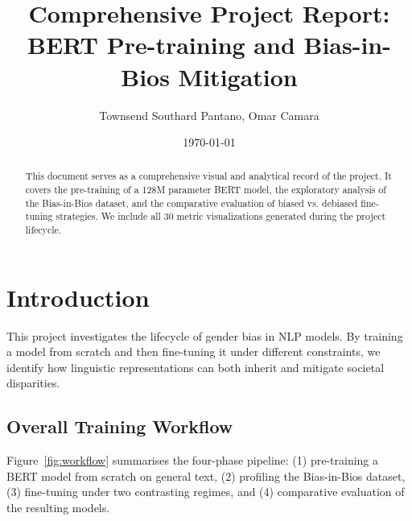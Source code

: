 \documentclass[11pt,letterpaper]{article}
\title{\textbf{Comprehensive Project Report: \\ BERT Pre-training and Bias-in-Bios Mitigation}}
\author{Townsend Southard Pantano, Omar Camara}
\date{\today}
\begin{document}
	
	\maketitle
	
	\begin{abstract}
		This document serves as a comprehensive visual and analytical record of the project. It covers the pre-training of a 128M parameter BERT model, the exploratory analysis of the Bias-in-Bios dataset, and the comparative evaluation of biased vs. debiased fine-tuning strategies. We include all 30 metric visualizations generated during the project lifecycle.
	\end{abstract}
	
	\section{Introduction}
	This project investigates the lifecycle of gender bias in NLP models. By training a model from scratch and then fine-tuning it under different constraints, we identify how linguistic representations can both inherit and mitigate societal disparities.
	
	\subsection{Overall Training Workflow}
	Figure~\ref{fig:workflow} summarises the four-phase pipeline: (1) pre-training a BERT model from scratch on general text, (2) profiling the Bias-in-Bios dataset, (3) fine-tuning under two contrasting regimes, and (4) comparative evaluation of the resulting models.
	
\end{document}
